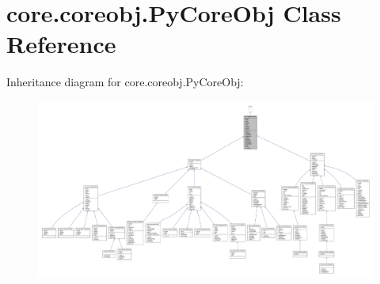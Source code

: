 \hypertarget{classcore_1_1coreobj_1_1_py_core_obj}{\section{core.\+coreobj.\+Py\+Core\+Obj Class Reference}
\label{classcore_1_1coreobj_1_1_py_core_obj}
}


Inheritance diagram for core.\+coreobj.\+Py\+Core\+Obj\+:
\nopagebreak
\begin{figure}[H]
\begin{center}
\leavevmode
\includegraphics[width=350pt]{classcore_1_1coreobj_1_1_py_core_obj__inherit__graph}
\end{center}
\end{figure}


